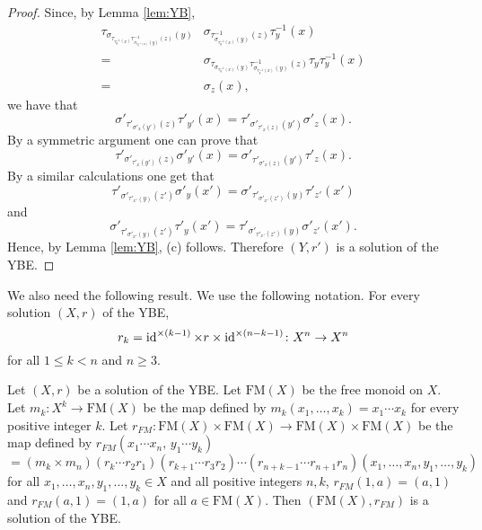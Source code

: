 \begin{proof}
Since, by Lemma \ref{lem:YB},
\begin{align*}
\tau_{\sigma_{\tau_{\tau^{-1}_y(x)}\tau^{-1}_{\sigma_{\tau^{-1}_y(x)}(y)}(z)}(y)}&\sigma_{\tau^{-1}_{\sigma_{\tau^{-1}_y(x)}(y)}(z)}\tau^{-1}_y(x)\\
=&\sigma_{\tau_{\sigma_{\tau^{-1}_y(x)}(y)}\tau^{-1}_{\sigma_{\tau^{-1}_y(x)}(y)}(z)} \tau_y{\tau^{-1}_y}(x)\\
=&\sigma_z(x), 
\end{align*}
we have that
\[\sigma'_{\tau'_{\sigma'_x(y')}(z)}\tau'_{y'}(x)=\tau'_{\sigma'_{\tau'_x(z)}(y')}\sigma'_{z}(x).\]
By a symmetric argument one can prove that
\[\tau'_{\sigma'_{\tau'_x(y')}(z)}\sigma'_{y'}(x)=\sigma'_{\tau'_{\sigma'_x(z)}(y')}\tau'_{z}(x).\]
By a similar calculations one get that
\[\tau'_{\sigma'_{\tau'_{x'}(y)}(z')}\sigma'_{y}(x')=\sigma'_{\tau'_{\sigma'_{x'}(z')}(y)}\tau'_{z'}(x')\]
and
\[\sigma'_{\tau'_{\sigma'_{x'}(y)}(z')}\tau'_{y}(x')=\tau'_{\sigma'_{\tau'_{x'}(z')}(y)}\sigma'_{z'}(x').\]
Hence, by Lemma \ref{lem:YB}, (c) follows. Therefore $(Y,r')$ is a solution of the YBE.
\end{proof}

We also need the following result. We use the following notation. For every solution $(X,r)$ of the YBE,
\[r_k=\operatorname{id}^{\times (k-1)}\times r\times\operatorname{id}^{\times (n-k-1)}\colon X^{n}\rightarrow X^n\]
for all $1\leq k<n$ and $n\geq 3$.
\begin{theorem}
\label{thm:solfreemonoid}
Let $(X,r)$ be a solution of the YBE. Let $\mathrm{FM}(X)$ be the free monoid on $X$. Let $m_k\colon X^{k}\rightarrow \mathrm{FM}(X)$ be the map defined by $m_k(x_1,\dots ,x_k)=x_1\cdots x_k$ for every positive integer $k$. Let $r_{FM}\colon \mathrm{FM}(X)\times \mathrm{FM}(X)\rightarrow \mathrm{FM}(X)\times \mathrm{FM}(X)$ be the map defined by $r_{FM}(x_1\cdots x_n,\, y_1\cdots y_k)$
\[=(m_k\times m_n)(r_k\cdots r_2r_1)(r_{k+1}\cdots r_3r_2)\cdots(r_{n+k-1}\cdots r_{n+1}r_n)(x_1,\dots ,x_n,y_1,\dots ,y_k)\]
for all $x_1,\dots ,x_n,y_1,\dots ,y_k\in X$ and all positive integers $n,k$,   $r_{FM}(1,a)=(a,1)$ and $r_{FM}(a,1)=(1,a)$ for all $a\in \mathrm{FM}(X)$. Then $(\mathrm{FM}(X),r_{FM})$ is a solution of the YBE.
\end{theorem}

